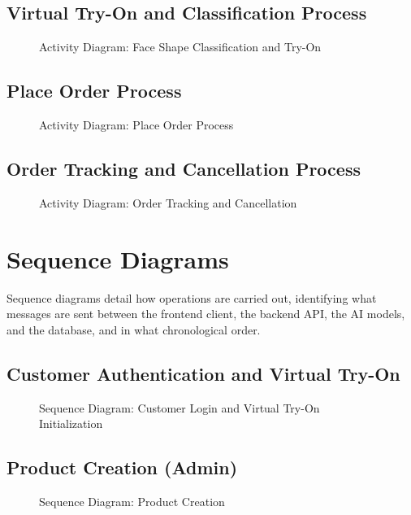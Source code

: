 \subsection{Virtual Try-On and Classification Process}
\begin{figure}[H]
    \centering
    \vspace{8cm}
    \caption{Activity Diagram: Face Shape Classification and Try-On}
    \label{fig:act_tryon}
\end{figure}

\subsection{Place Order Process}
\begin{figure}[H]
    \centering
    \vspace{8cm}
    \caption{Activity Diagram: Place Order Process}
    \label{fig:act_place_order}
\end{figure}

\subsection{Order Tracking and Cancellation Process}
\begin{figure}[H]
    \centering
    \vspace{8cm}
    \caption{Activity Diagram: Order Tracking and Cancellation}
    \label{fig:act_tracking}
\end{figure}

\section{Sequence Diagrams}
\label{sec:req_sequence}
Sequence diagrams detail how operations are carried out, identifying what messages are sent between the frontend client, the backend API, the AI models, and the database, and in what chronological order.

\subsection{Customer Authentication and Virtual Try-On}
\begin{figure}[H]
    \centering
    \vspace{9cm}
    \caption{Sequence Diagram: Customer Login and Virtual Try-On Initialization}
    \label{fig:seq_customer_login}
\end{figure}

\subsection{Product Creation (Admin)}
\begin{figure}[H]
    \centering
    \vspace{9cm}
    \caption{Sequence Diagram: Product Creation}
    \label{fig:seq_product_creation}
\end{figure}

